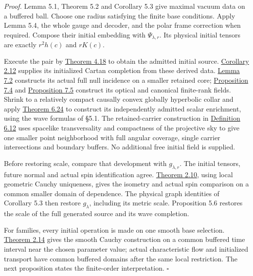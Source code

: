 \documentclass[
  english,
  11pt,
  reqno]{amsart}
\begin{document}
\emph{Proof.} Lemma 5.1, Theorem 5.2 and Corollary 5.3 give maximal
vacuum data on a buffered ball. Choose one radius satisfying the finite
base conditions. Apply Lemma 5.4, the whole gauge and decoder, and the
polar frame correction when required. Compose their initial embedding
with \(\Psi_{\lambda,r}\). Its physical initial tensors are exactly
\(r^2h(c)\) and \(rK(c)\).

Execute the pair by
\hyperref[thm:online-ordinary-negative-response-initial-source]{Theorem
4.18} to obtain the admitted initial source.
\hyperref[cor:online-ordinary-pair-cartan-collar]{Corollary 2.12}
supplies its initialized Cartan completion from these derived data.
\hyperref[lem:online-incidence-identification]{Lemma 7.2} constructs its
actual full null incidence on a smaller retained core;
\hyperref[prop:online-canonical-optical-completion]{Proposition 7.4} and
\hyperref[prop:online-canonical-finite-rank-models]{Proposition 7.5}
construct its optical and canonical finite-rank fields. Shrink to a
relatively compact causally convex globally hyperbolic collar and apply
\hyperref[thm:online-wave-enrichment-recognition]{Theorem 6.24} to
construct its independently admitted scalar enrichment, using the wave
formulas of §5.1. The retained-carrier construction in
\hyperref[def:online-wave-carrier-displays]{Definition 6.12} uses
spacelike transversality and compactness of the projective sky to give
one smaller point neighborhood with full angular coverage, single
carrier intersections and boundary buffers. No additional free initial
field is supplied.

Before restoring scale, compare that development with \(g_{\lambda,r}\).
The initial tensors, future normal and actual spin identification agree.
\hyperref[thm:online-marked-collar-full-hom]{Theorem 2.10}, using local
geometric Cauchy uniqueness, gives the isometry and actual spin
comparison on a common smaller domain of dependence. The physical graph
identities of Corollary 5.3 then restore \(g_\lambda\), including its
metric scale. Proposition 5.6 restores the scale of the full generated
source and its wave completion.

For families, every initial operation is made on one smooth base
selection. \hyperref[thm:online-common-collar-finite-families]{Theorem
2.14} gives the smooth Cauchy construction on a common buffered time
interval near the chosen parameter value; actual characteristic flow and
initialized transport have common buffered domains after the same local
restriction. The next proposition states the finite-order
interpretation. \hfill\(\square\)
\end{document}
